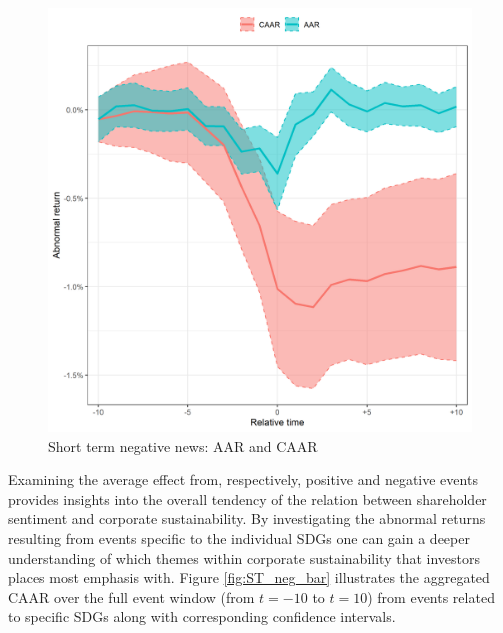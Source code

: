 \begin{figure} [H]
    \centering
    \includegraphics[scale=0.6]{Projekt/1.Figures analysis/ST_negative_all_CI.png}
    \caption{Short term negative news: AAR and CAAR}
    \label{fig:ST_neg_news}
\end{figure}

Examining the average effect from, respectively, positive and negative events provides insights into the overall tendency of the relation between shareholder sentiment and corporate sustainability. By investigating the abnormal returns resulting from events specific to the individual SDGs one can gain a deeper understanding of which themes within corporate sustainability that investors places most emphasis with. Figure \ref{fig:ST_neg_bar} illustrates the aggregated CAAR over the full event window (from $t=-10$ to $t=10$) from events related to specific SDGs along with corresponding confidence intervals.

